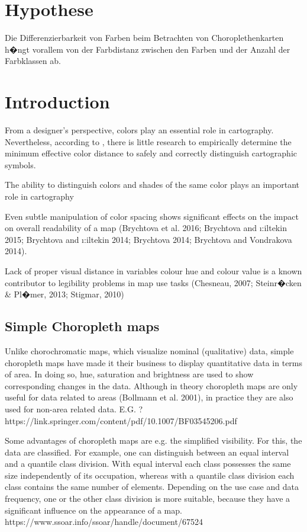 \section{Hypothese}
Die Differenzierbarkeit von Farben beim Betrachten von Choroplethenkarten h�ngt vorallem von der Farbdistanz zwischen den Farben und der Anzahl der Farbklassen ab.

\section{Introduction}
From a designer's perspective, colors play an essential role in cartography. Nevertheless, according to \textcite{brychtova2017}, there is little research to empirically determine the minimum effective color distance to safely and correctly distinguish cartographic symbols. 

The ability to distinguish colors and shades of the same color plays an important role in cartography \parencite{coltekin2017}

Even subtle manipulation of color spacing shows significant effects on the impact on overall readability of a map (Brychtova et al. 2016; Brychtova and \i:iltekin 2015; Brychtova and \i:iltekin 2014; Brychtova 2014; Brychtova and Vondrakova
2014). 

Lack of proper visual distance in variables colour hue and colour value is a known contributor to legibility problems in map use tasks (Chesneau, 2007; Steinr�cken \& Pl�mer, 2013; Stigmar, 2010)\parencite{brychtova2015}

\subsection{Simple Choropleth maps}
Unlike chorochromatic maps, which visualize nominal (qualitative) data, simple choropleth maps have made it their business to display quantitative data in terms of area. In doing so, hue, saturation and brightness are used to show corresponding changes in the data. Although in theory choropleth maps are only useful for data related to areas (Bollmann et al. 2001), in practice they are also used for non-area related data. E.G. ? https://link.springer.com/content/pdf/10.1007/BF03545206.pdf

Some advantages of choropleth maps are e.g. the simplified visibility. For this, the data are classified. For example, one can distinguish between an equal interval and a quantile class division. With equal interval each class possesses the same size independently of its occupation, whereas with a quantile class division each class contains the same number of elements. Depending on the use case and data frequency, one or the other class division is more suitable, because they have a significant influence on the appearance of a map.
https://www.ssoar.info/ssoar/handle/document/67524

